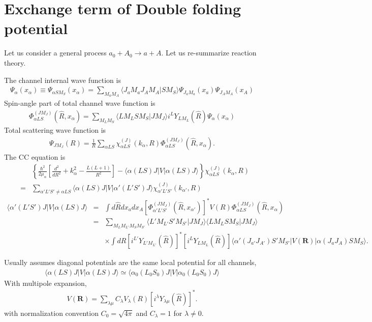 \documentclass[11pt]{book}
\def\bm{\boldsymbol}
\def\vR{{\bm R}}
\def\la{\langle}
\def\ra{\rangle}
\newcommand{\bea}{\begin{eqnarray}}
\newcommand{\eea}{\end{eqnarray}}
\newcommand{\no}{\nonumber \\}
\begin{document}
\section{Exchange term of Double folding potential}
Let us consider a general process $a_0+A_0\to a+A$.
Let us re-summarize reaction theory. 

The channel internal wave function is 
\bea 
\Psi_{\alpha}(x_\alpha)\equiv \Psi_{\alpha S M_S}(x_\alpha)
=\sum_{M_a M_A}\la J_a M_a J_A M_A|S M_S\ra \Psi_{J_a M_a}(x_a)\Psi_{J_A M_A}(x_A)
\eea 
Spin-angle part of total channel wave function is 
\bea 
\Phi^{(J M_J)}_{\alpha L S}(\hat{R},x_\alpha)
=\sum_{M_L M_S}\la L M_L S M_S|J M_J\ra i^L Y_{L M_L}(\hat{R}) \Psi_\alpha(x_\alpha)
\eea 
Total scattering wave function is
\bea 
\Psi_{J M_J}(R)=\frac{1}{R}\sum_{\alpha LS} \chi^{(J)}_{\alpha LS}(k_\alpha,R) \Phi^{(J M_J)}_{\alpha L S}(\hat{R},x_\alpha).
\eea 
The CC equation is 
\bea 
& &\left\{
\frac{\hbar^2}{2\mu_\alpha}[\frac{d^2}{dR^2}+k_\alpha^2-\frac{L(L+1)}{R^2} ]
     -\la \alpha(LS)J|V|\alpha(LS)J\ra   
\right\} \chi^{(J)}_{\alpha LS}(k_\alpha,R) \no 
&=&\sum_{\alpha' L' S'\neq \alpha L S} 
\la \alpha(LS)J|V|\alpha'(L'S')J\ra   \chi^{(J)}_{\alpha' L'S'}(k_{\alpha'},R)
\eea 
\bea 
\la \alpha'(L'S')J|V|\alpha(LS)J\ra
&=&\int d\hat{R} d x_a d x_A [ \Phi^{(J M_J)}_{\alpha' L'S'}(\hat{R},x_{\alpha'})   ]^*
        V(R) \Phi^{(J M_J)}_{\alpha LS}(\hat{R},x_{\alpha}) \no 
&=& \sum_{M_L M_{L'} M_S M_{S'}}\la L' M_{L'} S' M_{S'}|J M_J\ra \la L M_{L} S M_{S}|J M_J\ra 
\no & &\times 
    \int d\hat{R} [ i^{L'} Y_{L' M_{L'}}(\hat{R})]^*[ i^{L} Y_{L M_{L}}(\hat{R})]
    \la \alpha'(J_{a'} J_{A'})S' M_{S'}|V(\vR)|\alpha(J_a J_A)S M_S\ra.    \nonumber 
\eea 

Usually assumes diagonal potentials are the same local potential for all channels,
\bea 
\la \alpha(LS) J|V|\alpha(LS)J\ra\simeq \la \alpha_0(L_0 S_0)J|V|\alpha_0(L_0S_0)J\ra 
\eea 
With multipole expansion,
\bea 
V(\vR)=\sum_{\lambda\mu} C_\lambda V_\lambda(R)[ i^\lambda Y_{\lambda\mu}(\hat{R})]^*. 
\eea 
with normalization convention $C_0=\sqrt{4\pi}$ and $C_\lambda=1$ for $\lambda\neq 0$.
\end{document}
